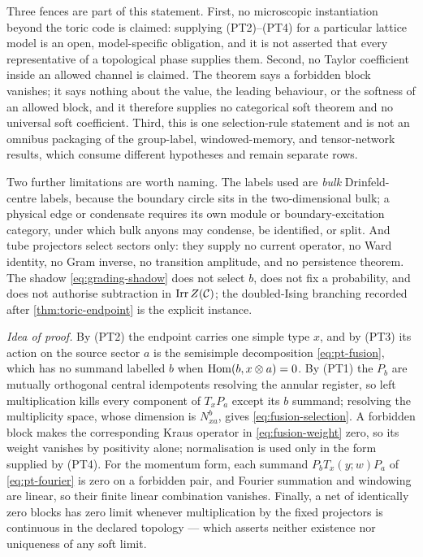 \begin{scope}
Three fences are part of this statement. First, no microscopic instantiation
beyond the toric code is claimed: supplying (PT2)--(PT4) for a particular
lattice model is an open, model-specific obligation, and it is not asserted
that every representative of a topological phase supplies them. Second, no
Taylor coefficient inside an allowed channel is claimed. The theorem says a
forbidden block vanishes; it says nothing about the value, the leading
behaviour, or the softness of an allowed block, and it therefore supplies no
categorical soft theorem and no universal soft coefficient. Third, this is one
selection-rule statement and is not an omnibus packaging of the group-label,
windowed-memory, and tensor-network results, which consume different
hypotheses and remain separate rows.

Two further limitations are worth naming. The labels used are \emph{bulk}
Drinfeld-centre labels, because the boundary circle sits in the
two-dimensional bulk; a physical edge or condensate requires its own module or
boundary-excitation category, under which bulk anyons may condense, be
identified, or split. And tube projectors select sectors only: they supply no
current operator, no Ward identity, no Gram inverse, no transition amplitude,
and no persistence theorem. The shadow \eqref{eq:grading-shadow} does not
select $b$, does not fix a probability, and does not authorise subtraction in
$\operatorname{Irr}Z(\mathcal{C})$; the doubled-Ising branching recorded after
\cref{thm:toric-endpoint} is the explicit instance.
\end{scope}

\emph{Idea of proof.} By (PT2) the endpoint carries one simple type $x$, and by
(PT3) its action on the source sector $a$ is the semisimple decomposition
\eqref{eq:pt-fusion}, which has no summand labelled $b$ when
$\operatorname{Hom}(b,x\otimes a)=0$. By (PT1) the $P_b$ are mutually orthogonal central
idempotents resolving the annular register, so left multiplication kills every
component of $T_x P_a$ except its $b$ summand; resolving the multiplicity
space, whose dimension is $N_{xa}^{b}$, gives \eqref{eq:fusion-selection}. A
forbidden block makes the corresponding Kraus operator in
\eqref{eq:fusion-weight} zero, so its weight vanishes by positivity alone;
normalisation is used only in the form supplied by (PT4). For the momentum
form, each summand $P_bT_x(y;w)P_a$ of \eqref{eq:pt-fourier} is zero on a
forbidden pair, and Fourier summation and windowing are linear, so their finite
linear combination vanishes. Finally, a net of identically zero blocks has zero
limit whenever multiplication by the fixed projectors is continuous in the
declared topology --- which asserts neither existence nor uniqueness of any
soft limit.

